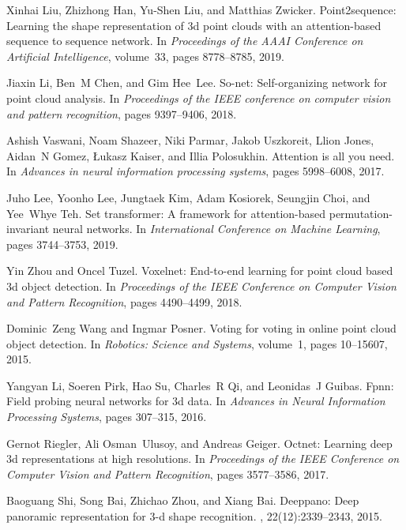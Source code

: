 \documentclass{ieeeaccess}
\begin{document}
\begin{thebibliography}{10}
Xinhai Liu, Zhizhong Han, Yu-Shen Liu, and Matthias Zwicker.
\newblock Point2sequence: Learning the shape representation of 3d point clouds
  with an attention-based sequence to sequence network.
\newblock In {\em Proceedings of the AAAI Conference on Artificial
  Intelligence}, volume~33, pages 8778--8785, 2019.

Jiaxin Li, Ben~M Chen, and Gim Hee~Lee.
\newblock So-net: Self-organizing network for point cloud analysis.
\newblock In {\em Proceedings of the IEEE conference on computer vision and
  pattern recognition}, pages 9397--9406, 2018.

Ashish Vaswani, Noam Shazeer, Niki Parmar, Jakob Uszkoreit, Llion Jones,
  Aidan~N Gomez, {\L}ukasz Kaiser, and Illia Polosukhin.
\newblock Attention is all you need.
\newblock In {\em Advances in neural information processing systems}, pages
  5998--6008, 2017.

Juho Lee, Yoonho Lee, Jungtaek Kim, Adam Kosiorek, Seungjin Choi, and Yee~Whye
  Teh.
\newblock Set transformer: A framework for attention-based
  permutation-invariant neural networks.
\newblock In {\em International Conference on Machine Learning}, pages
  3744--3753, 2019.

Yin Zhou and Oncel Tuzel.
\newblock Voxelnet: End-to-end learning for point cloud based 3d object
  detection.
\newblock In {\em Proceedings of the IEEE Conference on Computer Vision and
  Pattern Recognition}, pages 4490--4499, 2018.

Dominic~Zeng Wang and Ingmar Posner.
\newblock Voting for voting in online point cloud object detection.
\newblock In {\em Robotics: Science and Systems}, volume~1, pages 10--15607,
  2015.

Yangyan Li, Soeren Pirk, Hao Su, Charles~R Qi, and Leonidas~J Guibas.
\newblock Fpnn: Field probing neural networks for 3d data.
\newblock In {\em Advances in Neural Information Processing Systems}, pages
  307--315, 2016.

Gernot Riegler, Ali Osman~Ulusoy, and Andreas Geiger.
\newblock Octnet: Learning deep 3d representations at high resolutions.
\newblock In {\em Proceedings of the IEEE Conference on Computer Vision and
  Pattern Recognition}, pages 3577--3586, 2017.

Baoguang Shi, Song Bai, Zhichao Zhou, and Xiang Bai.
\newblock Deeppano: Deep panoramic representation for 3-d shape recognition.
, 22(12):2339--2343, 2015.


\end{thebibliography}
\end{document}
